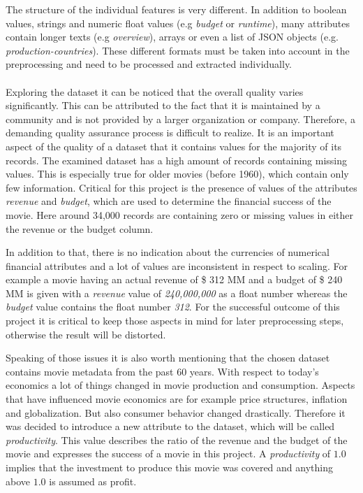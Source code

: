 The structure of the individual features is very different. In addition to boolean values, strings and numeric float values (e.g \textit{budget} or \textit{runtime}), many attributes contain longer texts (e.g \textit{overview}), arrays or even a list of JSON objects (e.g. \textit{production-countries}). These different formats must be taken into account in the preprocessing and need to be processed and extracted individually.
\\\\
Exploring the dataset it can be noticed that the overall quality varies significantly. This can be attributed to the fact that it is maintained by a community and is not provided by a larger organization or company. Therefore, a demanding quality assurance process is difficult to realize. It is an important aspect of the quality of a dataset that it contains values for the majority of its records. The examined dataset has a high amount of records containing missing values. This is especially true for older movies (before 1960), which contain only few information. Critical for this project is the presence of values of the attributes \textit{revenue} and \textit{budget}, which are used to determine the financial success of the movie. Here around 34,000 records are containing zero or missing values in either the revenue or the budget column.

In addition to that, there is no indication about the currencies of numerical financial attributes and a lot of values are inconsistent in respect to scaling. For example a movie having an actual revenue of \$ 312 MM and a budget of \$ 240 MM is given with a \textit{revenue} value of \textit{240,000,000} as a float number whereas the \textit{budget} value contains the float number \textit{312}. For the successful outcome of this project it is critical to keep those aspects in mind for later preprocessing steps, otherwise the result will be distorted.

Speaking of those issues it is also worth mentioning that the chosen dataset contains movie metadata from the past 60 years. With respect to today's economics a lot of things changed in movie production and consumption. Aspects that have influenced movie economics are for example price structures, inflation and globalization. But also consumer behavior changed drastically. Therefore it was decided to introduce a new attribute to the dataset, which will be called \textit{productivity}. This value describes the ratio of the revenue and the budget of the movie and expresses the success of a movie in this project. A \textit{productivity} of $1.0$ implies that the investment to produce this movie was covered and anything above $1.0$ is assumed as profit.
\\

